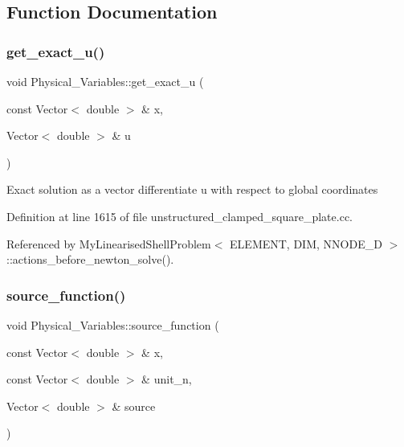 \subsection{Function Documentation}
\mbox{\label{namespacePhysical__Variables_af90d0c580c57b1152fd1cc7046055031}} 
\subsubsection{\texorpdfstring{get\+\_\+exact\+\_\+u()}{get\_exact\_u()}}
{\footnotesize\ttfamily void Physical\+\_\+\+Variables\+::get\+\_\+exact\+\_\+u (\begin{DoxyParamCaption}\item[{const Vector$<$ double $>$ \&}]{x,  }\item[{Vector$<$ double $>$ \&}]{u }\end{DoxyParamCaption})}

Exact solution as a vector differentiate u with respect to global coordinates 

Definition at line 1615 of file unstructured\+\_\+clamped\+\_\+square\+\_\+plate.\+cc.



Referenced by My\+Linearised\+Shell\+Problem$<$ E\+L\+E\+M\+E\+N\+T, D\+I\+M, N\+N\+O\+D\+E\+\_\+D $>$\+::actions\+\_\+before\+\_\+newton\+\_\+solve().

\mbox{\label{namespacePhysical__Variables_a36f0d0dc5f8aa4eafd7c4d6fe943c4e8}} 
\subsubsection{\texorpdfstring{source\+\_\+function()}{source\_function()}}
{\footnotesize\ttfamily void Physical\+\_\+\+Variables\+::source\+\_\+function (\begin{DoxyParamCaption}\item[{const Vector$<$ double $>$ \&}]{x,  }\item[{const Vector$<$ double $>$ \&}]{unit\+\_\+n,  }\item[{Vector$<$ double $>$ \&}]{source }\end{DoxyParamCaption})}



